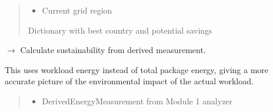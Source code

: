 \documentclass[letterpaper,10pt,english]{sphinxmanual}
\begin{document}
\begin{fulllineitems}
\begin{fulllineitems}
\begin{quote}
\begin{description}
\begin{itemize}
\item {} 
\sphinxAtStartPar
{} \textendash{} Current grid region

\end{itemize}

\sphinxAtStartPar
Dictionary with best country and potential savings

\end{description}\end{quote}

\end{fulllineitems}


\begin{fulllineitems}
\label{\detokenize{core.sustainability.calculator:core.sustainability.calculator.SustainabilityCalculator.calculate_from_derived}}
\pysigstartsignatures
\pysiglinewithargsret
{}
{\sphinxparamcomma {}\sphinxparamcomma {}}
{{ $\rightarrow$ {\hyperref[\detokenize{core.sustainability.calculator:core.sustainability.calculator.SustainabilityResult}]{}}}}
\pysigstopsignatures
\sphinxAtStartPar
Calculate sustainability from derived measurement.

\sphinxAtStartPar
This uses workload energy instead of total package energy,
giving a more accurate picture of the environmental impact
of the actual workload.
\begin{quote}\begin{description}
\begin{itemize}
\item {} 
\sphinxAtStartPar
{} \textendash{} DerivedEnergyMeasurement from Module 1 analyzer


\end{itemize}
\end{description}
\end{quote}
\end{fulllineitems}
\end{fulllineitems}
\end{document}
